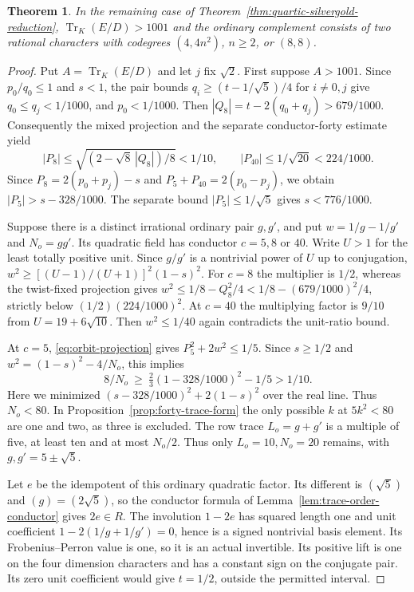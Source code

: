 \documentclass[11pt,reqno]{amsart}
\newtheorem{theorem}{Theorem}[section]
\theoremstyle{remark}\newtheorem{remark}[theorem]{Remark}
\numberwithin{equation}{section}
\begin{document}
\begin{theorem}\label{prop:forty-divergent-complements}
In the remaining case of Theorem~\ref{thm:quartic-silvergold-reduction},
$\operatorname{Tr}_K(E/D)>1001$ and the ordinary complement consists
of two rational characters with codegrees $(4,4n^2)$, $n\ge2$, or $(8,8)$.
\end{theorem}
\begin{proof}
Put $A=\operatorname{Tr}_K(E/D)$ and let $j$ fix $\sqrt2$.
First suppose $A>1001$. Since $p_0/q_0\le1$ and $s<1$, the
pair bounds $q_i\ge(t-1/\sqrt5)/4$ for $i\ne0,j$ give
$q_0\le q_j<1/1000$, and $p_0<1/1000$. Then
$|Q_8|=t-2(q_0+q_j)>679/1000$. Consequently the mixed projection
and the separate conductor-forty estimate yield
\[
 |P_8|\le\sqrt{(2-\sqrt8\,|Q_8|)/8}<1/10,\qquad
 |P_{40}|\le1/\sqrt{20}<224/1000.
\]
Since $P_8=2(p_0+p_j)-s$ and $P_5+P_{40}=2(p_0-p_j)$,
we obtain $|P_5|>s-328/1000$. The separate bound
$|P_5|\le1/\sqrt5$ gives $s<776/1000$.

Suppose there is a distinct irrational ordinary pair $g,g'$, and put
$w=1/g-1/g'$ and $N_o=gg'$. Its quadratic field has conductor
$c=5,8$ or $40$. Write $U>1$ for the least totally positive unit.
Since $g/g'$ is a nontrivial power of $U$ up to conjugation,
$w^2\ge[(U-1)/(U+1)]^2(1-s)^2$. For $c=8$ the multiplier is $1/2$,
whereas the twist-fixed projection gives
$w^2\le1/8-Q_8^2/4<1/8-(679/1000)^2/4$, strictly below
$(1/2)(224/1000)^2$. At $c=40$ the multiplying factor is $9/10$
from $U=19+6\sqrt{10}$. Then $w^2\le1/40$ again contradicts the unit-ratio bound.

At $c=5$, \eqref{eq:orbit-projection} gives $P_5^2+2w^2\le1/5$. Since $s\ge1/2$ and
$w^2=(1-s)^2-4/N_o$, this implies
\[
 8/N_o\ \ge\ \tfrac23(1-328/1000)^2-1/5>1/10.
\]
Here we minimized $(s-328/1000)^2+2(1-s)^2$ over the real line.
Thus $N_o<80$. In Proposition~\ref{prop:forty-trace-form} the
only possible $k$ at $5k^2<80$ are one and two, as three is excluded.
The row trace $L_o=g+g'$ is a multiple of five, at least ten and
at most $N_o/2$. Thus only $L_o=10,N_o=20$ remains, with
$g,g'=5\pm\sqrt5$.

Let $e$ be the idempotent of this ordinary quadratic factor.
Its different is $(\sqrt5)$ and $(g)=(2\sqrt5)$, so the conductor
formula of Lemma~\ref{lem:trace-order-conductor} gives $2e\in R$.
The involution $1-2e$ has squared length one and unit coefficient
$1-2(1/g+1/g')=0$, hence is a signed nontrivial basis element.
Its Frobenius--Perron value is one, so it is an actual invertible.
Its positive lift is one on the four dimension characters and
has a constant sign on the conjugate pair. Its zero unit coefficient
would give $t=1/2$, outside the permitted interval.


\end{proof}
\end{document}
